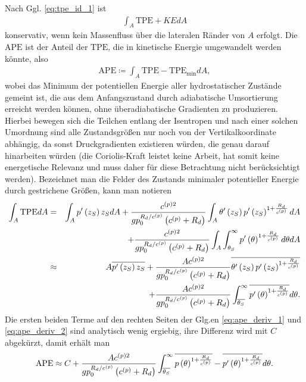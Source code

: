 \documentclass{book}
\newcommand\newoverline[1]{%
\overline{#1}}
\newcommand{\TPE}{\text{TPE}}
\newcommand{\APE}{\text{APE}}
\begin{document}
%
Nach Ggl. \eqref{eq:tpe_id_1} ist
%
\begin{eqnarray}
\int_A\TPE + KEdA
\end{eqnarray}
%
konservativ, wenn kein Massenfluss über die lateralen Ränder von $A$ erfolgt. Die $\APE$ ist der Anteil der $\TPE$, die in kinetische Energie umgewandelt werden könnte, also
%
\begin{eqnarray}
\APE \coloneqq \int_A\TPE - \TPE_{\text{min}}dA, 
\end{eqnarray}
%
wobei das Minimum der potentiellen Energie aller hydrostatischer Zustände gemeint ist, die aus dem Anfangszustand durch adiabatische Umsortierung erreicht werden können, ohne überadiabatische Gradienten zu produzieren. Hierbei bewegen sich die Teilchen entlang der Isentropen und nach einer solchen Umordnung sind alle Zustandsgrößen nur noch von der Vertikalkoordinate abhängig, da sonst Druckgradienten existieren würden, die genau darauf hinarbeiten würden (die Coriolis-Kraft leistet keine Arbeit, hat somit keine energetische Relevanz und muss daher für diese Betrachtung nicht berücksichtigt werden). Bezeichnet man die Felder des Zustands minimaler potentieller Energie durch gestrichene Größen, kann man notieren
%
\begin{eqnarray}
\int_A\TPE dA & = & \int_Ap'\left(z_S\right)z_SdA + \frac{c^{(p)2}}{gp_0^{R_d/c^{(p)}}\left(c^{(p)} + R_d\right)}\int_A\theta'\left(z_S\right)p'\left(z_S\right)^{1 + \frac{R_d}{c^{(p)}}}dA \nonumber\\
&&+\frac{c^{(p)2}}{gp_0^{R_d/c^{(p)}}\left(c^{(p)} + R_d\right)}\int_A\int_{\theta_S}^\infty p'\left(\theta\right)^{1 + \frac{R_d}{c^{(p)}}}d\theta dA\nonumber\\
& \approx & A\newoverline{p'\left(z_S\right)z_S} + \frac{Ac^{(p)2}}{gp_0^{R_d/c^{(p)}}\left(c^{(p)} + R_d\right)}\newoverline{\theta'\left(z_S\right)p'\left(z_S\right)^{1 + \frac{R_d}{c^{(p)}}}} \nonumber\\
&&+ \frac{Ac^{(p)2}}{gp_0^{R_d/c^{(p)}}\left(c^{(p)} + R_d\right)}\int_{\newoverline{\theta_S}}^\infty\newoverline{p'\left(\theta\right)^{1 + \frac{R_d}{c^{(p)}}}}d\theta.\label{eq:ape_deriv_2}
\end{eqnarray}
%
Die ersten beiden Terme auf den rechten Seiten der Glg.en \eqref{eq:ape_deriv_1} und \eqref{eq:ape_deriv_2} sind analytisch wenig ergiebig, ihre Differenz wird mit $C$ abgekürzt, damit erhält man
%
\begin{eqnarray}
\APE \approx C + \frac{Ac^{(p)2}}{gp_0^{R_d/c^{(p)}}\left(c^{(p)} + R_d\right)}\int_{\newoverline{\theta_S}}^\infty\newoverline{p\left(\theta\right)^{1 + \frac{R_d}{c^{(p)}}}} - \newoverline{p'\left(\theta\right)^{1 + \frac{R_d}{c^{(p)}}}}d\theta.
\end{eqnarray}
\end{document}
